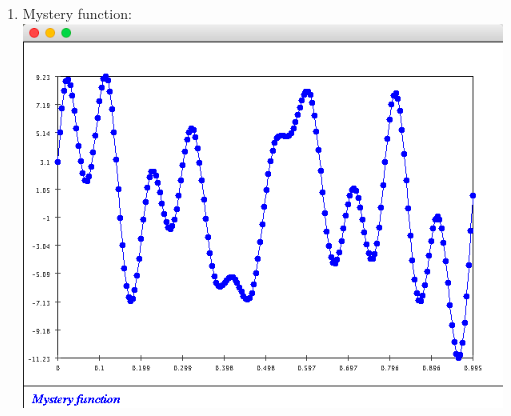 \documentclass{article}
\begin{document}
\begin{enumerate}
\item Mystery function: \\
\includegraphics[scale=0.5]{exercise4}


\end{enumerate}
\end{document}
